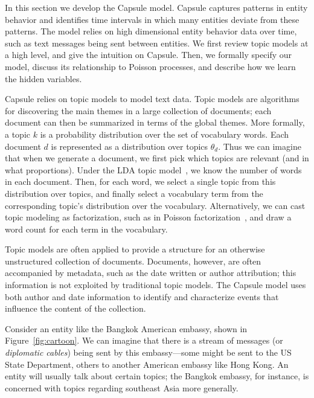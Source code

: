 
In this section we develop the Capsule model.  Capsule captures patterns in entity behavior and identifies time intervals in which many entities deviate from these patterns.  The model relies on high dimensional entity behavior data over time, such as text messages being sent between entities.  We first review topic models at a high level, and give the intuition on Capsule. Then, we formally specify our model, discuss its relationship to Poisson processes, and describe how we learn the hidden variables.

 Capsule relies on topic models to model text data.  Topic models are algorithms for discovering the main themes in a large collection of documents; each document can then be summarized in terms of the global themes.  More formally, a topic $k$ is a probability distribution over the set of vocabulary words.  Each document $d$ is represented as a distribution over topics $\theta_d$.  Thus we can imagine that when we generate a document, we first pick which topics are relevant (and in what proportions).  Under the LDA topic model~\cite{Blei:2003}, we know the number of words in each document.  Then, for each word, we select a single topic from this distribution over topics, and finally select a vocabulary term from the corresponding topic's distribution over the vocabulary.  Alternatively, we can cast topic modeling as factorization, such as in Poisson factorization~\cite{Gopalan:2014b}, and draw a word count for each term in the vocabulary.

Topic models are often applied to provide a structure for an otherwise unstructured collection of documents.  Documents, however, are often accompanied by metadata, such as the date written or author attribution; this information is not exploited by traditional topic models.  The Capsule model uses both author and date information to identify and characterize events that influence the content of the collection.

Consider an entity like the Bangkok American embassy, shown in Figure~\ref{fig:cartoon}.  We can imagine that there is a stream of messages (or \emph{diplomatic cables}) being sent by this embassy---some might be sent to the US State Department, others to another American embassy like Hong Kong.  An entity will usually talk about certain topics; the Bangkok embassy, for instance, is concerned with topics regarding southeast Asia more generally.

